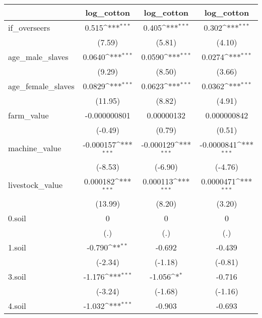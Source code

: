 {
\def\sym#1{\ifmmode^{#1}\else\(^{#1}\)\fi}
\begin{tabular}{l*{3}{c}}
\hline\hline
            &\multicolumn{1}{c}{log\_cotton}&\multicolumn{1}{c}{log\_cotton}&\multicolumn{1}{c}{log\_cotton}\\
\hline
if\_overseers&       0.515\sym{***}&       0.405\sym{***}&       0.302\sym{***}\\
            &      (7.59)         &      (5.81)         &      (4.10)         \\
[1em]
age\_male\_slaves&      0.0640\sym{***}&      0.0590\sym{***}&      0.0274\sym{***}\\
            &      (9.29)         &      (8.50)         &      (3.66)         \\
[1em]
age\_female\_slaves&      0.0829\sym{***}&      0.0623\sym{***}&      0.0362\sym{***}\\
            &     (11.95)         &      (8.82)         &      (4.91)         \\
[1em]
farm\_value  &-0.000000801         &  0.00000132         & 0.000000842         \\
            &     (-0.49)         &      (0.79)         &      (0.51)         \\
[1em]
machine\_value&   -0.000157\sym{***}&   -0.000129\sym{***}&  -0.0000841\sym{***}\\
            &     (-8.53)         &     (-6.90)         &     (-4.76)         \\
[1em]
livestock\_value&    0.000182\sym{***}&    0.000113\sym{***}&   0.0000471\sym{***}\\
            &     (13.99)         &      (8.20)         &      (3.20)         \\
[1em]
0.soil      &           0         &           0         &           0         \\
            &         (.)         &         (.)         &         (.)         \\
[1em]
1.soil      &      -0.790\sym{**} &      -0.692         &      -0.439         \\
            &     (-2.34)         &     (-1.18)         &     (-0.81)         \\
[1em]
3.soil      &      -1.176\sym{***}&      -1.056\sym{*}  &      -0.716         \\
            &     (-3.24)         &     (-1.68)         &     (-1.16)         \\
[1em]
4.soil      &      -1.032\sym{***}&      -0.903         &      -0.693         \\

\end{tabular}}
